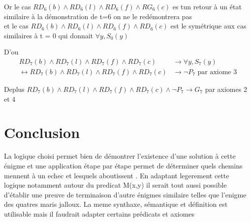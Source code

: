 \documentclass{article}
\begin{document}
Or le cas $RD_6(b) \wedge RD_6(l) \wedge RD_6(f) \wedge RG_6(c)$ es tun retour à un état similaire à la démonstration de t=6 on ne le redémontrera pas \\

et le cas $RD_6(b) \wedge RD_6(l) \wedge RD_6(f) \wedge RD_6(c)$ est le symétrique aux cas similaires à t = 0 qui donnait $\forall y, S_0(y)$

D'ou
\begin{align*}
  RD_7(b) \wedge RD_7(l) \wedge RD_7(f) \wedge RD_7(c) &\to \forall y, S_7(y)\\
  \leftrightarrow RD_7(b) \wedge RD_7(l) \wedge RD_7(f) \wedge RD_7(c) &\to \neg P_7 \text{ par axiome 3}
\end{align*}

Deplus $RD_7(b) \wedge RD_7(l) \wedge RD_7(f) \wedge RD_7(c) \wedge \neg P_7 \to G_7$ par axiomes 2 et 4

\section{Conclusion}

La logique choisi permet bien de démontrer l'existence d'une solution à cette énigme et une application étape par étape permet de déterminer quels chemins mennent à un echec et lesquels aboutissent . En adaptant legerement cette logique notamment autour du predicat M(x,y) il serait tout aussi possible d'établir une preuve de terminaison d'autre énigmes similaire telles que l'enigme des quatres maris jalloux. La meme synthaxe, sémantique et définition est utilisable mais il faudrait adapter certains prédicats et axiomes
\end{document}
